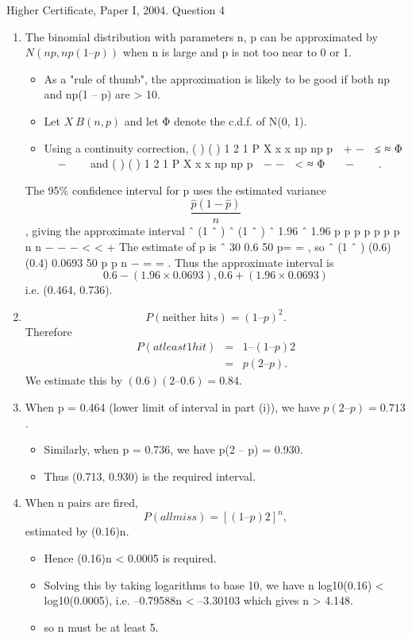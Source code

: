 \documentclass[a4paper,12pt]{article}
\begin{document}
Higher Certificate, Paper I, 2004. Question 4

\begin{enumerate}
\item  The binomial distribution with parameters n, p can be approximated by
$N(np, np(1 – p))$ when n is large and p is not too near to 0 or 1. 
\begin{itemize}
    \item As a "rule of thumb",
the approximation is likely to be good if both np and np(1 – p) are > 10.
\item Let $X ~ B(n, p)$ and let Φ denote the c.d.f. of N(0, 1). 

\item Using a continuity correction,
( )
( )
1
2
1
P X x x np
np p
 + −  ≤ ≈ Φ 
 −   
and ( )
( )
1
2
1
P X x x np
np p
 − −  < ≈ Φ 
 −   
.
\end{itemize}

The 95\% confidence interval for p uses the estimated variance $$\frac{\hat{p} (1− \hat{p} )}{n}$$ , giving the
approximate interval
ˆ (1 ˆ ) ˆ (1 ˆ )
ˆ 1.96 ˆ 1.96
p p p p
p p p
n n
− −
− < < +
The estimate of p is ˆ 30 0.6
50
p= = , so ˆ (1 ˆ ) (0.6)(0.4)
0.0693
50
p p
n
−
= = . Thus
the approximate interval is
\[0.6 − (1.96×0.0693) , 0.6 + (1.96×0.0693)\]
i.e. (0.464, 0.736).
\item  \[P(\mbox{neither hits}) = (1 – p)^2.\] Therefore 
\begin{eqnarray*}
P(at least 1 hit) &=& 1 – (1 – p)2 \\&=& p(2 – p).
\end{eqnarray*}
We estimate this by $(0.6)(2 – 0.6) = 0.84$.
\item  When p = 0.464 (lower limit of interval in part (i)), we have $p(2 – p) = 0.713$.

\begin{itemize}
\item Similarly, when p = 0.736, we have p(2 – p) = 0.930. 
\item Thus (0.713, 0.930) is the
required interval.
\end{itemize}
\item  When n pairs are fired, 
\[P(all miss) = [(1 – p)2]^n,\] estimated by (0.16)n. 
\begin{itemize}
    \item Hence
(0.16)n < 0.0005 is required. 
\item Solving this by taking logarithms to base 10, we have
n log10(0.16) < log10(0.0005), i.e. –0.79588n < –3.30103 which gives n > 4.148. 
\item so n
must be at least 5.
\end{itemize}

\end{enumerate}
\end{document}
